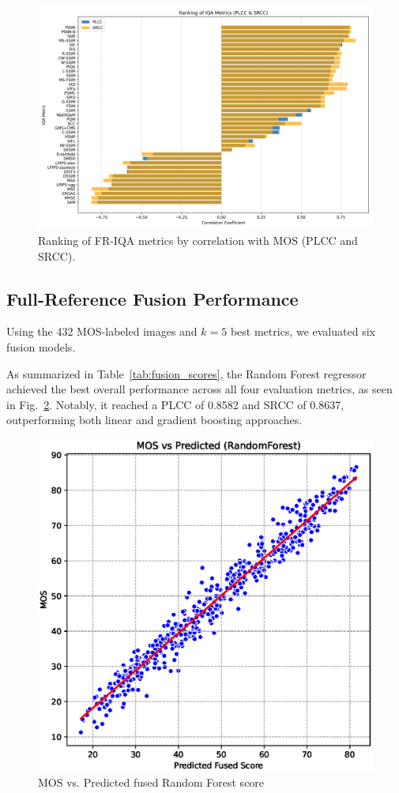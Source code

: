\begin{figure}
    \centering
    \includegraphics[width=0.9\linewidth]{images/metrics_bar.png}
    \caption{Ranking of FR-IQA metrics by correlation with MOS (PLCC and SRCC).}\label{fig:ranking}
\end{figure}

\subsection{Full-Reference Fusion Performance}

Using the 432 MOS-labeled images and $k = 5$ best metrics, we evaluated six fusion models.

As summarized in Table~\ref{tab:fusion_scores}, the Random Forest regressor achieved the best overall performance across all four evaluation metrics, as seen in Fig.~\ref{fig:randomforest}. Notably, it reached a PLCC of 0.8582 and SRCC of 0.8637, outperforming both linear and gradient boosting approaches.

\begin{figure}
    \centering
    \includegraphics[width=0.6\linewidth]{images/fusion_plot_RandomForest.eps}
    \caption{MOS vs. Predicted fused Random Forest score}\label{fig:randomforest}
\end{figure}

